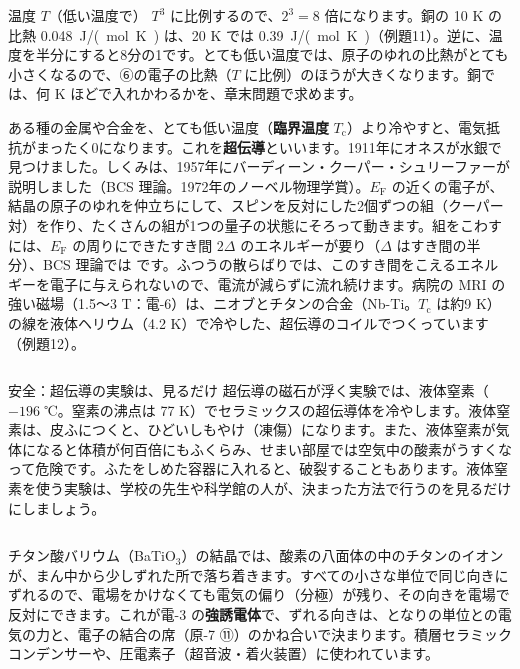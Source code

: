 \begin{phbaisuru}{温度 $T$（低い温度で）}
$T^3$ に比例するので、$2^3=8$ 倍になります。銅の 10 K の比熱 \qty{0.048}{J/(mol.K)} は、20 K では \qty{0.39}{J/(mol.K)}（例題11）。逆に、温度を半分にすると8分の1です。とても低い温度では、原子のゆれの比熱がとても小さくなるので、⑥の電子の比熱（$T$ に比例）のほうが大きくなります。銅では、何 K ほどで入れかわるかを、章末問題で求めます。
\end{phbaisuru}

\label{ph:原-8:sec12}
ある種の金属や合金を、とても低い温度（\textbf{臨界温度} $T_{\mathrm c}$）より冷やすと、電気抵抗がまったく0になります。これを\textbf{超伝導}といいます。1911年にオネスが水銀で見つけました。しくみは、1957年にバーディーン・クーパー・シュリーファーが説明しました（BCS 理論。1972年のノーベル物理学賞）。$E_{\mathrm F}$ の近くの電子が、結晶の原子のゆれを仲立ちにして、スピンを反対にした2個ずつの組（クーパー対）を作り、たくさんの組が1つの量子の状態にそろって動きます。組をこわすには、$E_{\mathrm F}$ の周りにできたすき間 $2\Delta$ のエネルギーが要り（$\Delta$ はすき間の半分）、BCS 理論では
\label{ph:原-8:bcs}です。ふつうの散らばりでは、このすき間をこえるエネルギーを電子に与えられないので、電流が減らずに流れ続けます。病院の MRI の強い磁場（1.5〜3 T：電-6）は、ニオブとチタンの合金（Nb-Ti。$T_{\mathrm c}$ は約9 K）の線を液体ヘリウム（4.2 K）で冷やした、超伝導のコイルでつくっています（例題12）。

\begin{column}{安全：超伝導の実験は、見るだけ}
超伝導の磁石が浮く実験では、液体窒素（$-196$ ℃。窒素の沸点は 77 K）でセラミックスの超伝導体を冷やします。液体窒素は、皮ふにつくと、ひどいしもやけ（凍傷）になります。また、液体窒素が気体になると体積が何百倍にもふくらみ、せまい部屋では空気中の酸素がうすくなって危険です。ふたをしめた容器に入れると、破裂することもあります。液体窒素を使う実験は、学校の先生や科学館の人が、決まった方法で行うのを見るだけにしましょう。
\end{column}

チタン酸バリウム（BaTiO$_3$）の結晶では、酸素の八面体の中のチタンのイオンが、まん中から少しずれた所で落ち着きます。すべての小さな単位で同じ向きにずれるので、電場をかけなくても電気の偏り（分極）が残り、その向きを電場で反対にできます。これが電-3 の\textbf{強誘電体}で、ずれる向きは、となりの単位との電気の力と、電子の結合の席（原-7 ⑪）のかね合いで決まります。積層セラミックコンデンサーや、圧電素子（超音波・着火装置）に使われています。

